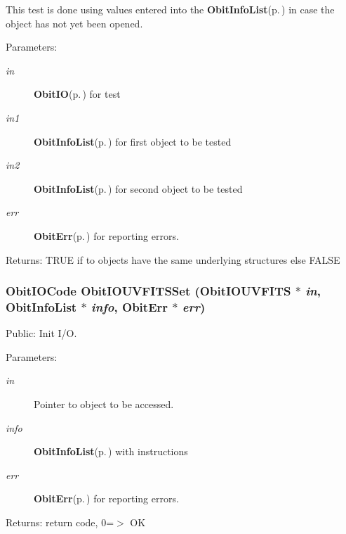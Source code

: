 This test is done using values entered into the {\bf Obit\-Info\-List}{\rm (p.\,\pageref{structObitInfoList})} in case the object has not yet been opened. \begin{Desc}
\item[Parameters:]
\begin{description}
\item[{\em in}]{\bf Obit\-IO}{\rm (p.\,\pageref{structObitIO})} for test \item[{\em in1}]{\bf Obit\-Info\-List}{\rm (p.\,\pageref{structObitInfoList})} for first object to be tested \item[{\em in2}]{\bf Obit\-Info\-List}{\rm (p.\,\pageref{structObitInfoList})} for second object to be tested \item[{\em err}]{\bf Obit\-Err}{\rm (p.\,\pageref{structObitErr})} for reporting errors. \end{description}
\end{Desc}
\begin{Desc}
\item[Returns:]TRUE if to objects have the same underlying structures else FALSE \end{Desc}
\subsubsection{\setlength{\rightskip}{0pt plus 5cm}Obit\-IOCode Obit\-IOUVFITSSet ({\bf Obit\-IOUVFITS} $\ast$ {\em in}, {\bf Obit\-Info\-List} $\ast$ {\em info}, {\bf Obit\-Err} $\ast$ {\em err})}\label{ObitIOUVFITS_8c_a26}


Public: Init I/O. 

\begin{Desc}
\item[Parameters:]
\begin{description}
\item[{\em in}]Pointer to object to be accessed. \item[{\em info}]{\bf Obit\-Info\-List}{\rm (p.\,\pageref{structObitInfoList})} with instructions \item[{\em err}]{\bf Obit\-Err}{\rm (p.\,\pageref{structObitErr})} for reporting errors. \end{description}
\end{Desc}
\begin{Desc}
\item[Returns:]return code, 0=$>$ OK \end{Desc}
